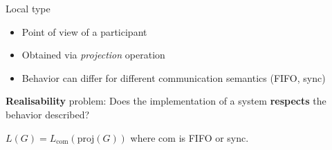 \documentclass{beamer}
\begin{document}
\begin{frame}{Local type}
	\begin{itemize}
		\item Point of view of a participant
		\item Obtained via \textit{projection} operation
		\item Behavior can differ for different communication semantics (FIFO, sync) 
	\end{itemize}

	\bigskip

	\textbf{Realisability} problem: Does the implementation of a system 
  \textbf{respects} the behavior described?

	\bigskip

	$L(G) = L_{\text{com}}(\text{proj}(G))$ where com is FIFO or sync.




\end{frame}

\end{document}
